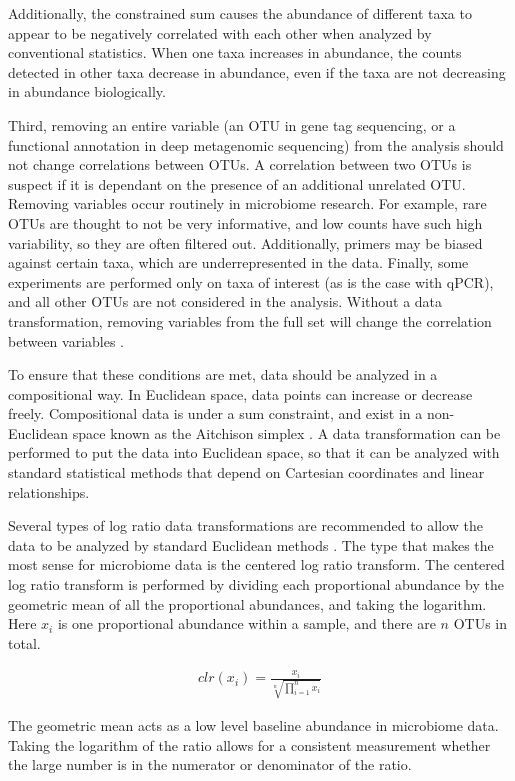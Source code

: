 Additionally, the constrained sum causes the abundance of different taxa to appear to be negatively correlated with each other when analyzed by conventional statistics. When one taxa increases in abundance, the counts detected in other taxa decrease in abundance, even if the taxa are not decreasing in abundance biologically.

Third, removing an entire variable (an OTU in gene tag sequencing, or a functional annotation in deep metagenomic sequencing) from the analysis should not change correlations between OTUs. A correlation between two OTUs is suspect if it is dependant on the presence of an additional unrelated OTU. Removing variables occur routinely in microbiome research. For example, rare OTUs are thought to not be very informative, and low counts have such high variability, so they are often filtered out. Additionally, primers may be biased against certain taxa, which are underrepresented in the data. Finally, some experiments are performed only on taxa of interest (as is the case with qPCR), and all other OTUs are not considered in the analysis. Without a data transformation, removing variables from the full set will change the correlation between variables \cite{aitchison1982statistical}.

To ensure that these conditions are met, data should be analyzed in a compositional way. In Euclidean space, data points can increase or decrease freely. Compositional data is under a sum constraint, and exist in a non-Euclidean space known as the Aitchison simplex \cite{aitchison1982statistical}. A data transformation can be performed to put the data into Euclidean space, so that it can be analyzed with standard statistical methods that depend on Cartesian coordinates and linear relationships.

Several types of log ratio data transformations are recommended to allow the data to be analyzed by standard Euclidean methods \cite{aitchison1982statistical}. The type that makes the most sense for microbiome data is the centered log ratio transform. The centered log ratio transform is performed by dividing each proportional abundance by the geometric mean of all the proportional abundances, and taking the logarithm. Here $x_i$ is one proportional abundance within a sample, and there are $n$ OTUs in total.

\begin{align*}
clr(x_i) = \frac{x_i}{\sqrt[n]{\prod_{i=1}^{n} x_i}}
\end{align*}

The geometric mean acts as a low level baseline abundance in microbiome data. Taking the logarithm of the ratio allows for a consistent measurement whether the large number is in the numerator or denominator of the ratio.

